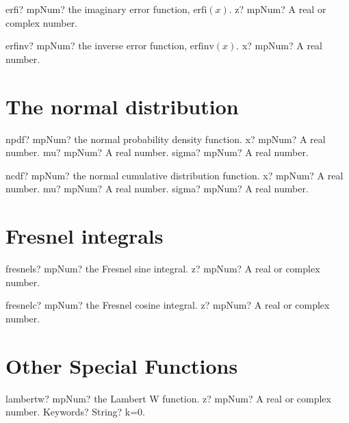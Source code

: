 \documentclass[12pt,a4paper,openany]{book}
\begin{document}
\begin{mpFunctionsExtract}
\mpFunctionOne
{erfi? mpNum? the imaginary error function, $\text{erfi}(x)$.}
{z? mpNum? A real or complex number.}
\end{mpFunctionsExtract}

\begin{mpFunctionsExtract}
\mpFunctionOne
{erfinv? mpNum? the inverse error function, $\text{erfinv}(x)$.}
{x? mpNum? A real number.}
\end{mpFunctionsExtract}

\section{The normal distribution}

\begin{mpFunctionsExtract}
\mpFunctionThree
{npdf? mpNum? the normal probability density function.}
{x? mpNum? A real number.}
{mu? mpNum? A real number.}
{sigma? mpNum? A real number.}
\end{mpFunctionsExtract}

\begin{mpFunctionsExtract}
\mpFunctionThree
{ncdf? mpNum? the normal cumulative distribution function.}
{x? mpNum? A real number.}
{mu? mpNum? A real number.}
{sigma? mpNum? A real number.}
\end{mpFunctionsExtract}

\section{Fresnel integrals}

\begin{mpFunctionsExtract}
\mpFunctionOne
{fresnels? mpNum? the Fresnel sine integral.}
{z? mpNum? A real or complex number.}
\end{mpFunctionsExtract}

\begin{mpFunctionsExtract}
\mpFunctionOne
{fresnelc? mpNum? the Fresnel cosine integral.}
{z? mpNum? A real or complex number.}
\end{mpFunctionsExtract}

\section{Other Special Functions}

\begin{mpFunctionsExtract}
\mpFunctionTwo
{lambertw? mpNum? the Lambert W function.}
{z? mpNum? A real or complex number.}
{Keywords? String? k=0.}
\end{mpFunctionsExtract}
\end{document}
